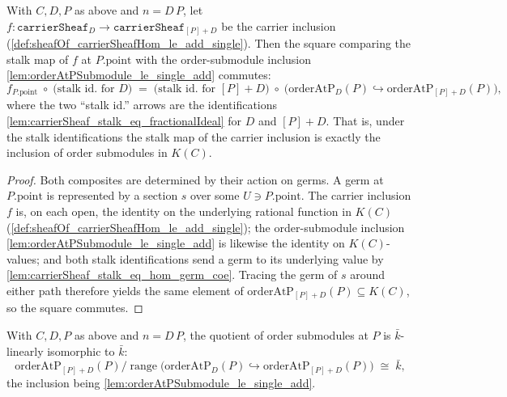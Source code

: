 \begin{lemma}
  \label{lem:cokernel_stalk_at_naturality}
  With \(C, D, P\) as above and \(n = D\,P\), let
  \(f : \texttt{carrierSheaf}_D \to \texttt{carrierSheaf}_{[P]+D}\) be the
  carrier inclusion (\cref{def:sheafOf_carrierSheafHom_le_add_single}). Then the
  square comparing the stalk map of \(f\) at \(P.\mathrm{point}\) with the
  order-submodule inclusion \cref{lem:orderAtPSubmodule_le_single_add} commutes:
  \[
    f_{P.\mathrm{point}} \;\circ\;
      \bigl(\text{stalk id.\ for } D\bigr)
    \;=\;
    \bigl(\text{stalk id.\ for } [P]+D\bigr) \;\circ\;
      \bigl(\mathrm{orderAtP}_D(P) \hookrightarrow
            \mathrm{orderAtP}_{[P]+D}(P)\bigr),
  \]
  where the two ``stalk id.'' arrows are the identifications
  \cref{lem:carrierSheaf_stalk_eq_fractionalIdeal} for \(D\) and \([P]+D\). That
  is, under the stalk identifications the stalk map of the carrier inclusion is
  exactly the inclusion of order submodules in \(K(C)\).
\end{lemma}

\begin{proof}
        \leanok
  Both composites are determined by their action on germs. A germ at
  \(P.\mathrm{point}\) is represented by a section \(s\) over some
  \(U \ni P.\mathrm{point}\). The carrier inclusion \(f\) is, on each open, the
  identity on the underlying rational function in \(K(C)\)
  (\cref{def:sheafOf_carrierSheafHom_le_add_single}); the order-submodule
  inclusion \cref{lem:orderAtPSubmodule_le_single_add} is likewise the identity
  on \(K(C)\)-values; and both stalk identifications send a germ to its
  underlying value by \cref{lem:carrierSheaf_stalk_eq_hom_germ_coe}. Tracing the
  germ of \(s\) around either path therefore yields the same element of
  \(\mathrm{orderAtP}_{[P]+D}(P) \subseteq K(C)\), so the square commutes.
\end{proof}

\begin{lemma}
  \label{lem:orderAtP_residue_linearEquiv}
  With \(C, D, P\) as above and \(n = D\,P\), the quotient of order submodules at
  \(P\) is \(\bar k\)-linearly isomorphic to \(\bar k\):
  \[
    \mathrm{orderAtP}_{[P]+D}(P)
      \big/ \operatorname{range}\!\bigl(
        \mathrm{orderAtP}_D(P) \hookrightarrow
        \mathrm{orderAtP}_{[P]+D}(P)\bigr)
    \;\cong\; \bar k,
  \]
  the inclusion being \cref{lem:orderAtPSubmodule_le_single_add}.
\end{lemma}

